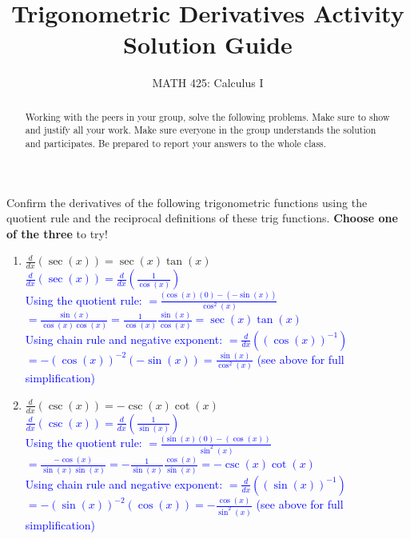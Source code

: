 \documentclass{ximera}
\title{Trigonometric Derivatives Activity Solution Guide}
\author{MATH 425: Calculus I}
\begin{document}
\begin{abstract}
    Working with the peers in your group, solve the following problems. Make sure to show and justify all your work. Make sure everyone in the group understands the solution and participates. Be prepared to report your answers to the whole class. 
\end{abstract}
\maketitle


\begin{exercise}
    Confirm the derivatives of the following trigonometric functions using the quotient rule and the reciprocal definitions of these trig functions.  \textbf{Choose one of the three} to try! 
    \begin{enumerate}
        \item $\frac{d}{dx}(\sec(x))=\sec(x)\tan(x)$\\
        \textcolor{blue}{ $\frac{d}{dx}(\sec(x))=\frac{d}{dx}(\frac{1}{\cos(x)})$\\
        Using the quotient rule: $=\frac{(\cos(x)(0)-(-\sin(x))}{\cos^2(x)}$\\
        $=\frac{\sin(x)}{\cos(x)\cos(x)}=\frac{1}{\cos(x)}\frac{\sin(x)}{\cos(x)}=\sec(x)\tan(x)$\\
        Using chain rule and negative exponent: $=\frac{d}{dx}((\cos(x))^{-1})$\\
        $=-(\cos(x))^{-2}(-\sin(x))=\frac{\sin(x)}{\cos^2(x)}$ (see above for full simplification)}

        \item $\frac{d}{dx}(\csc(x))=-\csc(x)\cot(x)$\\
        \textcolor{blue}{ $\frac{d}{dx}(\csc(x))=\frac{d}{dx}(\frac{1}{\sin(x)})$\\
        Using the quotient rule: $=\frac{(\sin(x)(0)-(\cos(x))}{\sin^2(x)}$\\
        $=\frac{-\cos(x)}{\sin(x)\sin(x)}=-\frac{1}{\sin(x)}\frac{\cos(x)}{\sin(x)}=-\csc(x)\cot(x)$\\
        Using chain rule and negative exponent: $=\frac{d}{dx}((\sin(x))^{-1})$\\
        $=-(\sin(x))^{-2}(\cos(x))=-\frac{\cos(x)}{\sin^2(x)}$ (see above for full simplification)}


\end{enumerate}
\end{exercise}
\end{document}

